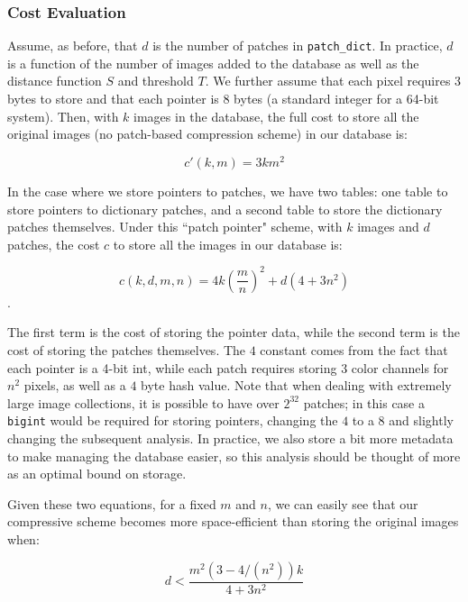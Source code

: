 \subsubsection{Cost Evaluation}
\label{sec:costeval}

Assume, as before, that $d$ is the number of patches in \texttt{patch\_dict}.  In practice, $d$ is a function of the number of images added to the database as well as the distance function $S$ and threshold $T$.  We further assume that each pixel requires 3 bytes to store and that each pointer is 8 bytes (a standard integer for a 64-bit system).  Then, with $k$ images in the database, the full cost to store all the original images (no patch-based compression scheme) in our database is:

\begin{equation}
	 c'(k, m) = 3  k  m^2
\end{equation}

\noindent In the case where we store pointers to patches, we have two tables: one table to store pointers to dictionary patches, and a second table to store the dictionary patches themselves.  Under this ``patch pointer" scheme, with $k$ images and $d$ patches, the cost $c$ to store all the images in our database is:

\begin{equation}
	c(k, d, m, n) = 4 k \left(\frac{m}{n}\right)^2 + d (4 + 3 n^2)
\end{equation}.

The first term is the cost of storing the pointer data, while the second term is the cost of storing the patches themselves.  The $4$ constant comes from the fact that each pointer is a 4-bit int, while each patch requires storing $3$ color channels for $n^2$ pixels,
as well as a $4$ byte hash value.  Note that when dealing with extremely large image collections, it is possible to have over $2^{32}$ patches; in this case a \texttt{bigint} would be required for storing pointers, changing the $4$ to a $8$ and slightly changing the subsequent analysis.  In practice, we also store a bit more metadata to make managing the database easier, so this analysis should be thought of more as an optimal bound on storage.

Given these two equations, for a fixed $m$ and $n$, we can easily see that our compressive scheme becomes more space-efficient than storing the original images when:

\begin{equation}
	d < \frac{m^2 (3 - 4/(n^2)) k}{4 + 3n^2}
\end{equation}


